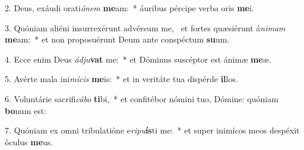 2. Deus, exáudi orati\textit{ó}\textit{nem} \textbf{me}am:~*  áuribus pércipe verba oris \textbf{me}i.\

3. Quóniam aliéni insurrexérunt advérsum me, \dag\  et fortes quæsiérunt á\textit{ni}\textit{mam} \textbf{me}am:~*  et non proposuérunt Deum ante conspéctum \textbf{su}um.\

4. Ecce enim Deus \textit{ád}\textit{ju}\textbf{vat} me:~*  et Dóminus suscéptor est ánimæ \textbf{me}æ.\

5. Avérte mala ini\textit{mí}\textit{cis} \textbf{me}is:~*  et in veritáte tua dispérde \textbf{il}los.\

6. Voluntárie sacrifi\textit{cá}\textit{bo} \textbf{ti}bi,~*  et confitébor nómini tuo, Dómine: quóniam \textbf{bo}num est:\

7. Quóniam ex omni tribulatióne e\textit{ri}\textit{pu}\textbf{ís}ti me:~*  et super inimícos meos despéxit óculus \textbf{me}us.\

